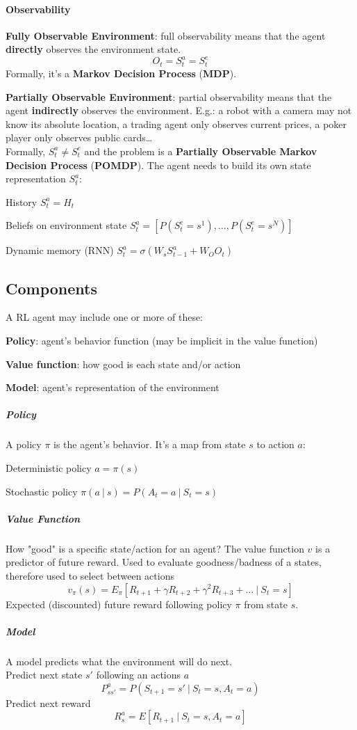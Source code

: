 \documentclass[10pt]{report}
\begin{document}
\paragraph{Observability}
\begin{list}{}{}
	\item \textbf{Fully Observable Environment}: full observability means that the agent \textbf{directly} observes the environment state.
	$$O_t = S_t^a = S_t^e$$
	Formally, it's a \textbf{Markov Decision Process} (\textbf{MDP}).
	\item \textbf{Partially Observable Environment}: partial observability means that the agent \textbf{indirectly} observes the environment. E.g.: a robot with a camera may not know its absolute location, a trading agent only observes current prices, a poker player only observes public cards\ldots\\
	Formally, $S_t^a\neq S_t^e$ and the problem is a \textbf{Partially Observable Markov Decision Process} (\textbf{POMDP}). The agent needs to build its own state representation $S_t^a$:
	\begin{list}{}{}
		\item History $S_t^a = H_t$
		\item Beliefs on environment state $S_t^a = [P(S_t^e=s^1),\ldots,P(S_t^e=s^N)]$
		\item Dynamic memory (RNN) $S_t^a = \sigma(W_sS_{t-1}^a + W_OO_t)$
	\end{list}
\end{list}
\subsection{Components}
A RL agent may include one or more of these:
\begin{list}{}{}
	\item \textbf{Policy}: agent's behavior function (may be implicit in the value function)
	\item \textbf{Value function}: how good is each state and/or action
	\item \textbf{Model}: agent's representation of the environment
\end{list}
\subparagraph{Policy} A policy $\pi$ is the agent's behavior. It's a map from state $s$ to action $a$:
\begin{list}{}{}
	\item Deterministic policy $a = \pi(s)$
	\item Stochastic policy $\pi(a\:|\:s) = P(A_t = a\:|\:S_t = s)$
\end{list}
\subparagraph{Value Function} How "good" is a specific state/action for an agent? The value function $v$ is a predictor of future reward. Used to evaluate goodness/badness of a states, therefore used to select between actions
$$v_\pi(s)= E_\pi[R_{t+1} + \gamma R_{t+2} + \gamma^2 R_{t+3} + \ldots\:|\:S_t=s]$$
Expected (discounted) future reward following policy $\pi$ from state $s$.
\subparagraph{Model} A model predicts what the environment will do next.\\
Predict next state $s'$ following an actions $a$
$$P_{ss'}^a = P(S_{t+1} = s'\:|\:S_t = s, A_t = a)$$
Predict next reward
$$R_s^a = E[R_{t+1}\:|\:S_t=s,A_t=a]$$
\end{document}
